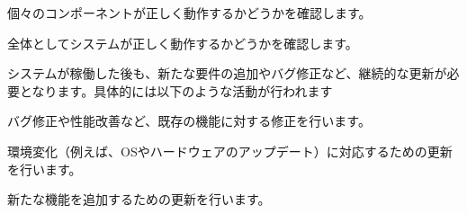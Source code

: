 個々のコンポーネントが正しく動作するかどうかを確認します。




全体としてシステムが正しく動作するかどうかを確認します。



システムが稼働した後も、新たな要件の追加やバグ修正など、継続的な更新が必要となります。具体的には以下のような活動が行われます




バグ修正や性能改善など、既存の機能に対する修正を行います。




環境変化（例えば、OSやハードウェアのアップデート）に対応するための更新を行います。




新たな機能を追加するための更新を行います。




\begin{appendices}

\end{appendices}
